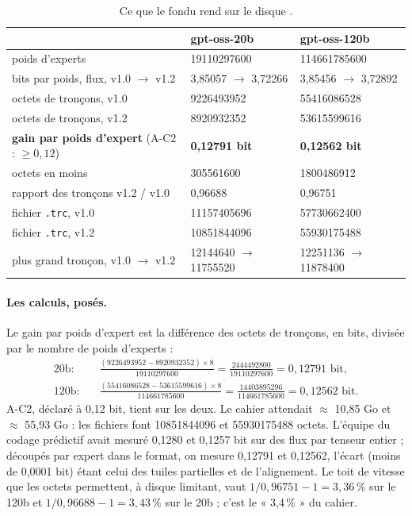 \begin{table}[ht]
\centering\small
\caption[Ce que le fondu rend sur le disque]{Ce que le fondu rend sur le disque \mes.}
\label{t3cod:tab:tailles}
\begin{tabular}{@{}lll@{}}
\toprule
& gpt-oss-20b & gpt-oss-120b \\
\midrule
poids d'experts & \num{19110297600} & \num{114661785600} \\
bits par poids, flux, v1.0 $\to$ v1.2 & 3,85057 $\to$ 3,72266 & 3,85456 $\to$ 3,72892 \\
octets de tronçons, v1.0 & \num{9226493952} & \num{55416086528} \\
octets de tronçons, v1.2 & \num{8920932352} & \num{53615599616} \\
\textbf{gain par poids d'expert} (A-C2 : $\ge 0{,}12$) & \textbf{0,12791 bit} & \textbf{0,12562 bit} \\
octets en moins & \num{305561600} & \num{1800486912} \\
rapport des tronçons v1.2 / v1.0 & 0,96688 & 0,96751 \\
fichier \texttt{.trc}, v1.0 & \num{11157405696} & \num{57730662400} \\
fichier \texttt{.trc}, v1.2 & \num{10851844096} & \num{55930175488} \\
plus grand tronçon, v1.0 $\to$ v1.2 & \num{12144640} $\to$ \num{11755520} & \num{12251136} $\to$ \num{11878400} \\
\bottomrule
\end{tabular}
\end{table}

\paragraph{Les calculs, posés.} Le gain par poids d'expert est la différence des octets de tronçons, en bits, divisée par le nombre de poids d'experts \calc :
\begin{align*}
\text{20b} :&\quad \frac{(\num{9226493952} - \num{8920932352}) \times 8}{\num{19110297600}} = \frac{\num{2444492800}}{\num{19110297600}} = 0{,}12791 \text{ bit},\\
\text{120b} :&\quad \frac{(\num{55416086528} - \num{53615599616}) \times 8}{\num{114661785600}} = \frac{\num{14403895296}}{\num{114661785600}} = 0{,}12562 \text{ bit}.
\end{align*}
A-C2, déclaré à 0,12 bit, tient sur les deux. Le cahier attendait $\approx$ 10,85 Go et $\approx$ 55,93 Go : les fichiers font \num{10851844096} et \num{55930175488} octets. L'équipe du codage prédictif avait mesuré 0,1280 et 0,1257 bit sur des flux par tenseur entier ; découpés par expert dans le format, on mesure 0,12791 et 0,12562, l'écart (moins de 0,0001 bit) étant celui des tuiles partielles et de l'alignement. Le toit de vitesse que les octets permettent, à disque limitant, vaut $1/0{,}96751 - 1 = 3{,}36\,\%$ sur le 120b et $1/0{,}96688 - 1 = 3{,}43\,\%$ sur le 20b \calc ; c'est le « 3,4\,\% » du cahier.

